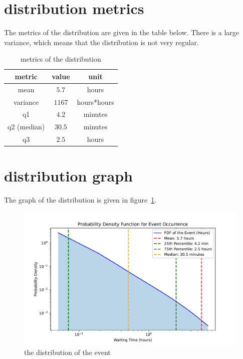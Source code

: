 \section{distribution metrics}

The metrics of the distribution are given in the table below. There is a large variance, which means that the distribution is not very regular.
\begin{table}[h]
\centering
\begin{tabular}{c|c|c}
    \hline
    metric & value & unit\\
    \hline
    mean & $5.7$ & hours \\
    variance & $1167$ & hours*hours \\
    q1 & $4.2$ & minutes \\
    q2 (median) & $30.5$ & minutes \\
    q3 & $2.5$ & hours \\
    \hline
\end{tabular}
\caption{metrics of the distribution \label{tab:metrics}}
\end{table}
\FloatBarrier

\section{distribution graph}
The graph of the distribution is given in figure~\ref{fig:distribution}.
\begin{figure}[h]
\centering
\includegraphics[width=13cm]{code/figures/pdf_event_occurrence.pdf}
\caption{the distribution of the event \label{fig:distribution}}
\end{figure}
\FloatBarrier

